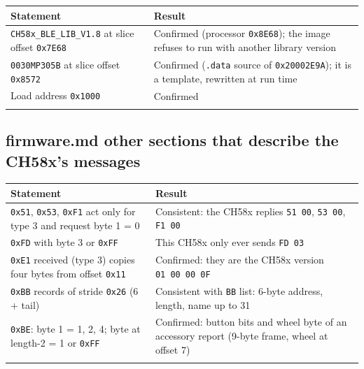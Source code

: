 {\def\LTcaptype{none} %
\begin{longtable}[]{@{}
  >{\raggedright\arraybackslash}p{}
  >{\raggedright\arraybackslash}p{}@{}}
\toprule\noalign{}
\begin{minipage}[b]{\linewidth}\raggedright
Statement
\end{minipage} & \begin{minipage}[b]{\linewidth}\raggedright
Result
\end{minipage} \\
\midrule\noalign{}
\endhead
\bottomrule\noalign{}
\endlastfoot
\texttt{CH58x\_BLE\_LIB\_V1.8} at slice offset \texttt{0x7E68} &
Confirmed (processor \texttt{0x8E68}); the image refuses to run with
another library version \\
\texttt{0030MP305B} at slice offset \texttt{0x8572} & Confirmed
(\texttt{.data} source of \texttt{0x20002E9A}); it is a template,
rewritten at run time \\
Load address \texttt{0x1000} & Confirmed \\*
\end{longtable}
}

\subsection{firmware.md other sections that describe the CH58x's
messages}\label{firmware.md-other-sections-that-describe-the-ch58xs-messages}

{\def\LTcaptype{none} %
\begin{longtable}[]{@{}
  >{\raggedright\arraybackslash}p{}
  >{\raggedright\arraybackslash}p{}@{}}
\toprule\noalign{}
\begin{minipage}[b]{\linewidth}\raggedright
Statement
\end{minipage} & \begin{minipage}[b]{\linewidth}\raggedright
Result
\end{minipage} \\
\midrule\noalign{}
\endhead
\bottomrule\noalign{}
\endlastfoot
\texttt{0x51}, \texttt{0x53}, \texttt{0xF1} act only for type 3 and
request byte 1 = 0 & Consistent: the CH58x replies \texttt{51\ 00},
\texttt{53\ 00}, \texttt{F1\ 00} \\
\texttt{0xFD} with byte 3 or \texttt{0xFF} & This CH58x only ever sends
\texttt{FD\ 03} \\
\texttt{0xE1} received (type 3) copies four bytes from offset
\texttt{0x11} & Confirmed: they are the CH58x version
\texttt{01\ 00\ 00\ 0F} \\
\texttt{0xBB} records of stride \texttt{0x26} (6 + tail) & Consistent
with \texttt{BB} list: 6-byte address, length, name up to 31 \\
\texttt{0xBE}: byte 1 = 1, 2, 4; byte at length-2 = 1 or \texttt{0xFF} &
Confirmed: button bits and wheel byte of an accessory report (9-byte
frame, wheel at offset 7) \\*
\end{longtable}
}


